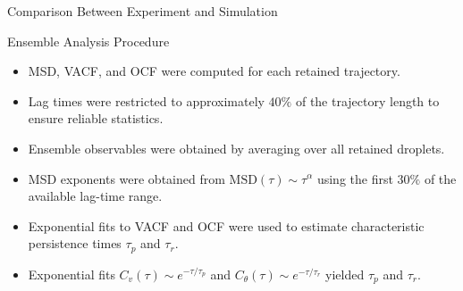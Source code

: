


\begin{frame}{Comparison Between Experiment and Simulation}

	\begin{alertblock}{Ensemble Analysis Procedure}

		\begin{itemize}

			\item MSD, VACF, and OCF were computed for each retained trajectory.

			\item Lag times were restricted to approximately
			      $40\%$ of the trajectory length to ensure reliable statistics.

			\item Ensemble observables were obtained by averaging over all retained droplets.

			\item MSD exponents were obtained from
			      $\mathrm{MSD}(\tau)\sim\tau^\alpha$
			      using the first $30\%$ of the available lag-time range.
			\item Exponential fits to VACF and OCF were used
			      to estimate characteristic persistence times
			      $\tau_p$ and $\tau_r$.
			\item Exponential fits
			      $C_v(\tau)\sim e^{-\tau/\tau_p}$ and
			      $C_\theta(\tau)\sim e^{-\tau/\tau_r}$
			      yielded $\tau_p$ and $\tau_r$.

		\end{itemize}

	\end{alertblock}


\end{frame}
